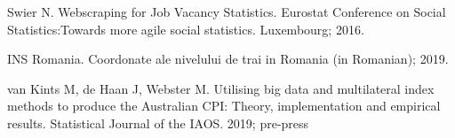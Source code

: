 \documentclass[]{article}
\begin{document}
\begin{thebibliography}{99}
Swier N. Webscraping for Job Vacancy Statistics. Eurostat Conference on Social Statistics:Towards more agile social statistics. Luxembourg; 2016.

INS Romania. Coordonate ale nivelului de trai in Romania (in Romanian); 2019.

van Kints M, de Haan J, Webster M. Utilising big data and multilateral index methods to produce the Australian CPI: Theory, implementation and empirical results. Statistical Journal of the IAOS. 2019; pre-press


\end{thebibliography}
\end{document}
